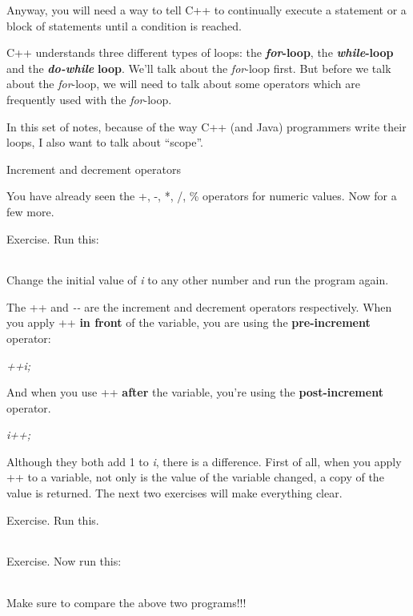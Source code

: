 \documentclass[
]{article}
\begin{document}
Anyway, you will need a way to tell C++ to continually execute a
statement or a block of statements until a condition is reached.

C++ understands three different types of loops: the
\emph{\textbf{for}}\textbf{-loop}, the
\emph{\textbf{while}}\textbf{-loop} and the
\emph{\textbf{do-while}}\textbf{ loop}. We'll talk about the
\emph{for}-loop first. But before we talk about the \emph{for}-loop, we
will need to talk about some operators which are frequently used with
the \emph{for}-loop.

In this set of notes, because of the way C++ (and Java) programmers
write their loops, I also want to talk about ``scope''.

Increment and decrement operators

You have already seen the +, -, *, /, \% operators for numeric values.
Now for a few more.

Exercise. Run this:

\begin{longtable}[]{@{}@{}}
\toprule
\endhead
\bottomrule
\end{longtable}

Change the initial value of \emph{i} to any other number and run the
program again.

The ++ and \emph{-\/-} are the increment and decrement operators
respectively. When you apply ++ \textbf{in front} of the variable, you
are using the \textbf{pre-increment} operator:

\emph{++i;}

And when you use ++ \textbf{after} the variable, you're using the
\textbf{post-increment} operator.

\emph{i++;}

Although they both add 1 to \emph{i}, there is a difference. First of
all, when you apply ++ to a variable, not only is the value of the
variable changed, a copy of the value is returned. The next two
exercises will make everything clear.

Exercise. Run this.

\begin{longtable}[]{@{}@{}}
\toprule
\endhead
\bottomrule
\end{longtable}

Exercise. Now run this:

\begin{longtable}[]{@{}@{}}
\toprule
\endhead
\bottomrule
\end{longtable}

Make sure to compare the above two programs!!!
\end{document}
